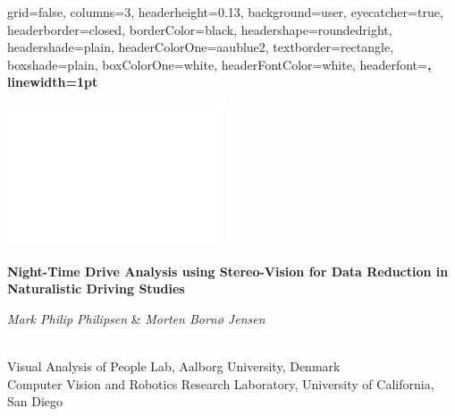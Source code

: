\documentclass[paperwidth=48in,paperheight=42in,landscape]{baposter}
\begin{document}
\begin{poster}{
  grid=false,
  columns=3,
  headerheight=0.13\textheight,
  background=user,
  eyecatcher=true,
  headerborder=closed,
  borderColor=black,
  headershape=roundedright,
  headershade=plain,
  headerColorOne=aaublue2,
  textborder=rectangle,
  boxshade=plain,
  boxColorOne=white,
  headerFontColor=white,
  headerfont=\Large\sf\bf,
  linewidth=1pt
}
{

  \includegraphics[height=0.75\headerheight]{aau_logo_new_neg}
 
 
}
{\color{white}\bf
  Night-Time Drive Analysis using Stereo-Vision for Data Reduction in Naturalistic Driving Studies
}
{\color{white}\small
  \vspace{0.7em} \begin{large} \textit{Mark Philip Philipsen} \& \textit{Morten Bornø Jensen} \end{large} \\[0.7em]
Visual Analysis of People Lab, Aalborg University, Denmark \\
Computer Vision and Robotics Research Laboratory, University of California, San Diego

}
{
 
}
\end{poster}
\end{document}
